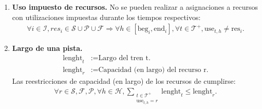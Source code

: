 \documentclass[letter, 10pt]{article}
\begin{document}
\begin{description}
\begin{enumerate}
        \item \textbf{Uso impuesto de recursos.} No se pueden realizar a asignaciones a recursos con utilizaciones impuestas durante los tiempos respectivos:
        \begin{align*}
            \forall i \in \mathcal{I}, res_i \in \mathcal{S} \cup \mathcal{P} \cup \mathcal{F} \Rightarrow \forall h \in [\text{beg}_i, \text{end}_i], \forall t \in \mathcal{T}^+, \text{use}_{t,h} \neq \text{res}_i.
        \end{align*}

        \item \textbf{Largo de una pista.}
        \begin{align*}
            \text{lenght}_t &:= \text{Largo del tren t.} \\
            \text{lenght}_r &:= \text{Capacidad (en largo) del recurso r.}
        \end{align*}
        Las reestricciones de capacidad (en largo) de los recursos de cumplirse:
        \begin{align*}
            \forall r \in \mathcal{S}, \mathcal{F}, \mathcal{P}, \forall h \in \mathcal{H}, \sum_{\substack{t \in \mathcal{T}^+ \\ \text{use}_{t,h} = r}} \text{lenght}_t \leq \text{lenght}_r.
        \end{align*}


\end{enumerate}
\end{description}
\end{document}
